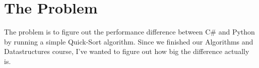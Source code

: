 \section{The Problem}

The problem is to figure out the performance difference between C\# and Python by running a simple Quick-Sort algorithm. Since we finished our Algorithms and Datastructures course, I've wanted to figure out how big the difference actually is.
